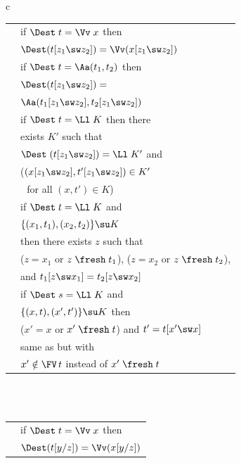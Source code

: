 \begin{figure}%
\centering 
{\small
\begin{tabular}{c} 
	\vspace*{-1.5ex}
\begin{tabular}{|c|l|}	
	\hline
\textrm{\ISwVr} 
&
if $\Dest\;t = \Vv\;x$ then 
\\&
$\Dest(t[z_1\sw z_2]) = \Vv (x[z_1 \sw z_2])$
\\\hline	
\textrm{\ISwAp} 
&
if $\Dest\;t = \Aa(t_1,t_2)$ then 
\\&
$\Dest(t[z_1 \sw z_2]) =\,$ 
\\&
$\Aa(t_1[z_1 \sw z_2],t_2[z_1 \sw z_2])$
\\\hline 	
\textrm{\ISwLm}
&
if $\Dest\;t = \Ll\;K$ then there 
\\& exists $K'$ 
such that 
\\&
$\Dest\;(t[z_1\sw z_2]) = \Ll\;K'$ and 
\\&
($(x[z_1\sw z_2],t'[z_1\sw z_2]) \in K'$ 
\\&
 \ $\,$for all 
$(x,t') \in K$)
\\\hline 
\textrm{\ISwCg} 
&
if $\Dest\;t = \Ll\;K$ and 
\\&
$\{(x_1,t_1),(x_2,t_2)\} \su K$ 
\\
&
then there exists $z$ such that 
\\&
($z = x_1$ or $z\;\fresh\;t_1$), 
($z = x_2$ or $z\;\fresh\;t_2$), 
\\&
and 
$t_1[z\sw x_1] = t_2[z\sw x_2]$ 
\\\hline
\textrm{\ISwBvr} 
&
if $\Dest\;s = \Ll\;K$ and 
\\& $\{(x,t),(x',t')\} \su K$
then 
\\&($x' = x$ or $x'\;\fresh\;t$) and $t' = t[x' \sw x]$
\\\hline
\!\textrm{\ISwBvrT} 
&
same as \ISwBvr{} but with 
\\&
$x'\notin \FV\,t$ instead of $x'\;\fresh\;t$
\\\hline
\end{tabular} 	
\\ \\  \vspace*{-1.5ex}
\begin{tabular}{|c|l|}	
	\hline
	\textrm{\IRnVr}
	& 
	if $\Dest\;t = \Vv\;x$ then 
	\\&
	$\Dest(t[y / z]) = \Vv(x[y/z])$  
	\\\hline 

\end{tabular}
\end{tabular}}
\end{figure}
